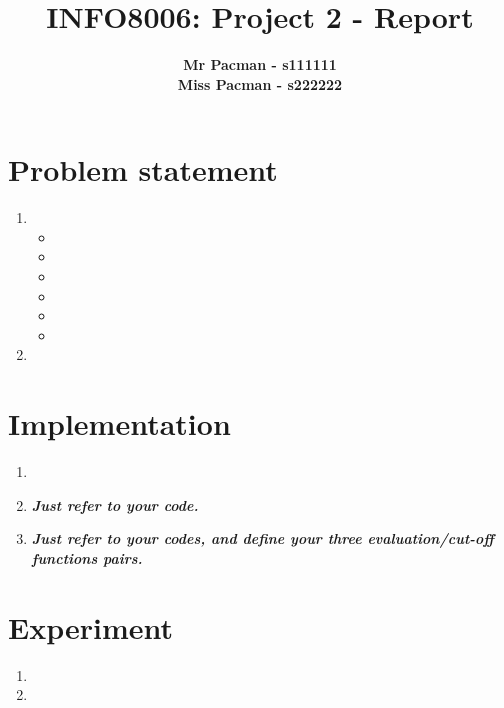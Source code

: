 \documentclass{article}
\begin{document}

\title{\Large{INFO8006: Project 2 - Report}}
\vspace{1cm}
\author{\small{\bf Mr Pacman - s111111} \\ \small{\bf Miss Pacman - s222222}}

\maketitle


\section{Problem statement}

\begin{enumerate}[label=\alph*.,leftmargin=*]
    \item
    \begin{itemize}
        \item
        \item
        \item
        \item
        \item
        \item
    \end{itemize}
    \item
\end{enumerate}

\section{Implementation}

\begin{enumerate}[label=\alph*.,leftmargin=*]
    \item
    \item \textbf{\textit{Just refer to your code.}}
    \item \textbf{\textit{Just refer to your codes, and define your three evaluation/cut-off functions pairs.}}
\end{enumerate}

\section{Experiment}

\begin{enumerate}[label=\alph*.,leftmargin=*]
    \item
    \item
\end{enumerate}



\end{document}
